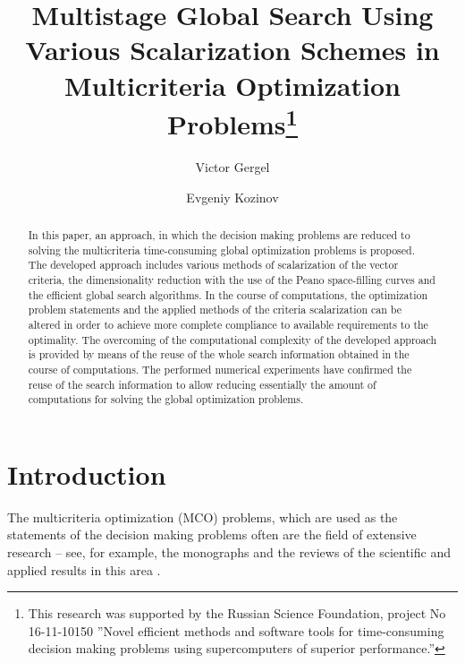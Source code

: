 \documentclass[runningheads]{llncs}
\begin{document}
%
\title{Multistage Global Search Using Various Scalarization Schemes in Multicriteria Optimization Problems\thanks{This research was supported by the Russian Science Foundation, project No 16-11-10150 ''Novel efficient methods and software tools for time-consuming decision making problems using supercomputers of superior performance.''}}
%
%
\author{Victor Gergel \and
Evgeniy Kozinov}
%
%
%
\maketitle              %
%
\begin{abstract}
In this paper, an approach, in which the decision making problems are reduced to solving the multicriteria time-consuming global optimization problems is proposed. The developed approach includes various methods of scalarization of the vector criteria, the dimensionality reduction with the use of the Peano space-filling curves and the efficient global search algorithms. In the course of computations, the optimization problem statements and the applied methods of the criteria scalarization can be altered in order to achieve more complete compliance to available requirements to the optimality. The overcoming of the computational complexity of the developed approach is provided by means of the reuse of the whole search information obtained in the course of computations. The performed numerical experiments have confirmed the reuse of the search information to allow reducing essentially the amount of computations for solving the global optimization problems.

\end{abstract}
%
%
%
\section{Introduction}	
\label{sec:01}
The multicriteria optimization (MCO) problems, which are used as the statements of the decision making problems often are the field of extensive research -- see, for example, the monographs \cite{c1,c2,c3} and the reviews of the scientific and applied results in this area \cite{c4,c5}.
\end{document}
